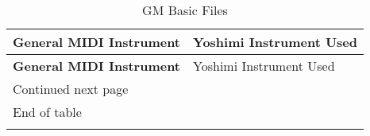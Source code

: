 %
%
%

\label{table:gm_basic_files}
\begin{longtable}{|l l|}

\caption{GM Basic Files} \\

\hline
   \textbf{General MIDI Instrument} &
      Yoshimi Instrument Used \\
\hline
\endfirsthead

\hline
   \textbf{General MIDI Instrument} &
      Yoshimi Instrument Used \\
\hline
\endhead

\hline
   Continued next page & \\
\hline
\endfoot

\hline
   End of table & \\
\hline
\endlastfoot


\end{longtable}
